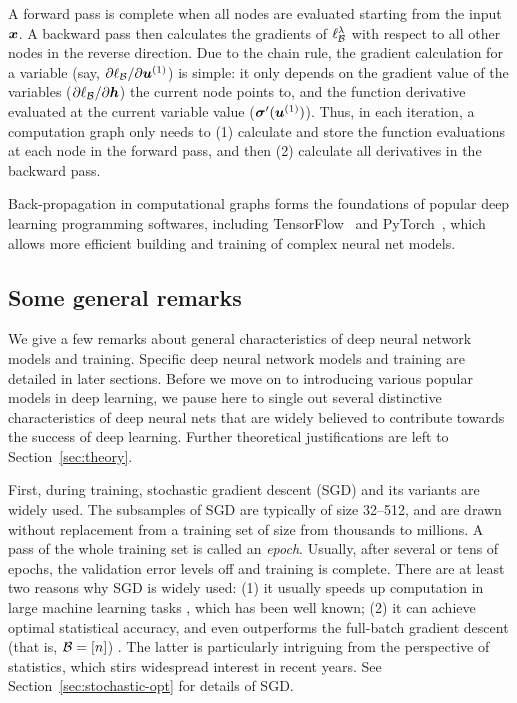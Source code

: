 A forward pass is complete when all nodes are evaluated starting from the input $\text{\boldmath $x$}$. A backward pass then calculates the gradients of $\ell_{\mathcal{B}}^\lambda$ with respect to all other nodes in the reverse direction. Due to the chain rule, the gradient calculation for a variable (say, $\partial \ell_{\mathcal{B}} / \partial \text{\boldmath $u$}^{(1)}$) is simple: it only depends on the gradient value of the variables ($\partial \ell_{\mathcal{B}} / \partial \text{\boldmath $h$}$) the current node points to, and the function derivative evaluated at the current variable value ($\bm{\sigma}'(\text{\boldmath $u$}^{(1)})$). Thus, in each iteration, a computation graph only needs to (1) calculate and store the function evaluations at each node in the forward pass, and then (2) calculate all derivatives in the backward pass.

Back-propagation in computational graphs forms the foundations of popular deep learning programming softwares, including TensorFlow~\citep{tensorflow2015-whitepaper} and PyTorch~\citep{paszke2017automatic}, which allows more efficient building and training of complex neural net models.  %

\subsection{Some general remarks}

We give a few remarks about general characteristics of deep neural network models and training. Specific deep neural network models and training are detailed in later sections.
Before we move on to introducing various popular models in deep learning, we pause here to single out several distinctive characteristics of deep neural nets that are widely believed to contribute towards the success of deep learning. Further theoretical justifications are left to Section~\ref{sec:theory}. 


First, during training, stochastic gradient descent (SGD) and its variants are widely used. The subsamples of SGD are typically of size 32--512, and are drawn without replacement from a training set of size from thousands to millions. A pass of the whole training set is called an \textit{epoch}. Usually, after several or tens of epochs, the validation error levels off and training is complete.  There are at least two reasons why SGD is widely used: (1) it usually speeds up computation in large machine learning tasks \citep{bottou2010large}, which has been well known; (2) it can achieve optimal statistical accuracy, and even outperforms the full-batch gradient descent (that is, $\mathcal{B} = [n]$) \citep{keskar2016large}. The latter is particularly intriguing from the perspective of statistics, which stirs widespread interest in recent years. See Section~\ref{sec:stochastic-opt} for details of SGD. 

